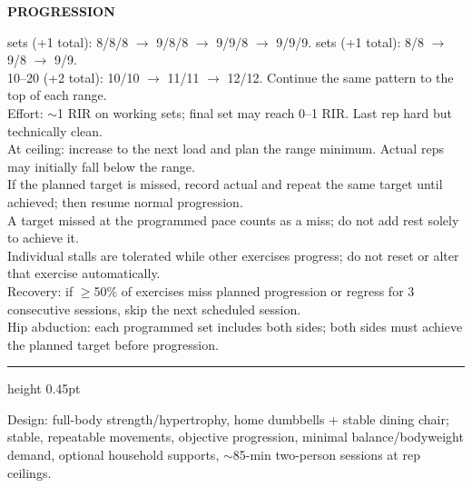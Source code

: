 \documentclass[11pt,a4paper]{article}
\begin{document}
\vspace{0.31cm}
\begin{tcolorbox}[
  enhanced,
  colback=panelbg,
  colframe=grid,
  boxrule=0.65pt,
  arc=3.0mm,
  left=3.0mm,right=3.0mm,top=2.0mm,bottom=2.0mm,
  boxsep=0mm,
  before skip=0pt,after skip=0pt
]
{\fontsize{10.2}{11.4}\selectfont\bfseries PROGRESSION}\par\vspace{0.14cm}
{\fontsize{7.05}{8.25} sets (+1 total): 8/8/8 $\to$ 9/8/8 $\to$ 9/9/8 $\to$ 9/9/9. sets (+1 total): 8/8 $\to$ 9/8 $\to$ 9/9.\\[-1.4pt]
10--20 (+2 total): 10/10 $\to$ 11/11 $\to$ 12/12. Continue the same pattern to the top of each range.\\[-1.4pt]
Effort: $\sim$1 RIR on working sets; final set may reach 0--1 RIR. Last rep hard but technically clean.\\[-1.4pt]
At ceiling: increase to the next load and plan the range minimum. Actual reps may initially fall below the range.\\[-1.4pt]
If the planned target is missed, record actual and repeat the same target until achieved; then resume normal progression.\\[-1.4pt]
A target missed at the programmed pace counts as a miss; do not add rest solely to achieve it.\\[-1.4pt]
Individual stalls are tolerated while other exercises progress; do not reset or alter that exercise automatically.\\[-1.4pt]
Recovery: if $\geq$50\% of exercises miss planned progression or regress for 3 consecutive sessions, skip the next scheduled session.\\[-1.4pt]
Hip abduction: each programmed set includes both sides; both sides must achieve the planned target before progression.
}
\end{tcolorbox}

\vspace{0.34cm}
\noindent\begin{minipage}{\linewidth}
{\color{grid}\hrule height 0.45pt}
\vspace{0.18cm}
{\fontsize{6.05}{7.2}\selectfont\color{muted}
Design: full-body strength/hypertrophy, home dumbbells + stable dining chair; stable, repeatable movements, objective progression, minimal balance/bodyweight demand, optional household supports, $\sim$85-min two-person sessions at rep ceilings.
}
\end{minipage}
\end{document}
